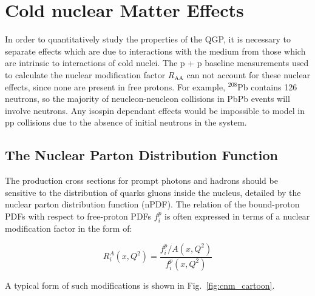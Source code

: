\section{Cold nuclear Matter Effects}
In order to quantitatively study the properties of the QGP, it is necessary to separate effects which are due to interactions with the medium from those which are intrinsic to interactions of cold nuclei. The p + p baseline measurements used to calculate the nuclear modification factor $R_\mathrm{AA}$ can not account for these nuclear effects, since none are present in free protons. For example, $^{208}$Pb contains 126 neutrons, so the majority of neucleon-neucleon collisions in PbPb events will involve neutrons. Any isospin dependant effects would be impossible to model in pp collisions due to the absence of initial neutrons in the system.

\subsection{The Nuclear Parton Distribution Function}
The production cross sections for prompt photons and hadrons should be sensitive to the distribution of quarks gluons inside the nucleus, detailed by the nuclear parton distribution function (nPDF). The relation of the bound-proton PDFs with respect to free-proton PDFs $f_i^p$ is often expressed in terms of a nuclear modification factor in the form of:

\begin{equation}
  R_i^A(x,Q^2) = \frac{f_i^p/A(x,Q^2)}{f_i^p(x,Q^2)} 
\end{equation}

A typical form of such modifications is shown in Fig.~\ref{fig:cnm_cartoon}.

